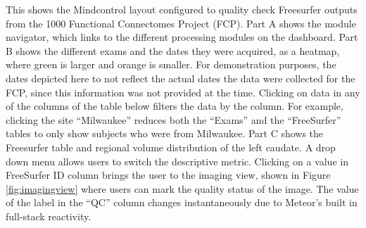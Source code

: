 \label{fig:dashboard}

This shows the Mindcontrol layout configured to quality check Freesurfer outputs from the 1000 Functional Connectomes Project (FCP). Part A shows the module navigator, which links to the different processing modules on the dashboard. Part B shows the different exams and the dates they were acquired, as a heatmap, where green is larger and orange is smaller. For demonstration purposes, the dates depicted here to not reflect the actual dates the data were collected for the FCP, since this information was not provided at the time. Clicking on data in any of the columns of the table below filters the data by the column. For example, clicking the site ``Milwaukee'' reduces both the ``Exams'' and the ``FreeSurfer'' tables to only show subjects who were from Milwaukee. Part C shows the Freesurfer table and regional volume distribution of the left caudate. A drop down menu allows users to switch the descriptive metric. Clicking on a value in FreeSurfer ID column brings the user to the imaging view, shown in Figure \ref{fig:imagingview} where users can mark the quality status of the image. The value of the label in the ``QC'' column changes instantaneously due to Meteor's built in full-stack reactivity. 